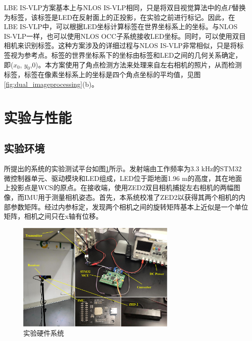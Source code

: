 LBE IS-VLP方案基本上与NLOS IS-VLP相同，只是将双目视觉算法中的点$P$替换为标签，该标签是LED在反射面上的正投影，在实验之前进行标记。因此，在LBE IS-VLP中，可以根据LED坐标计算标签在世界坐标系上的坐标。与NLOS IS-VLP一样，也可以使用NLOS OCC子系统接收LED坐标。同时，可以使用双目相机来识别标签。这种方案涉及的详细过程与NLOS IS-VLP非常相似，只是将标签视为参考点。标签的世界坐标系下的坐标由标签和LED之间的几何关系确定，即(${x_{0}}$, ${y_{0}}$,${0}$)。本方案使用了角点检测方法来处理来自左右相机的照片，从而检测标签，标签在像素坐标系上的坐标是四个角点坐标的平均值，见图\ref{fig:dual_imageprocessing}(b)。
 
\section{实验与性能}
\subsection{实验环境}
所提出的系统的实验测试平台如图\ref{fig:dual_environment-setup}所示。发射端由工作频率为3.3 kHz的STM32微控制器单元、驱动模块和LED组成，LED位于距地面1.96 m的高度，其在地面上投影点是WCS的原点。在接收端，使用ZED2双目相机捕捉左右相机的两幅图像，而IMU用于测量相机姿态。首先，本系统校准了ZED2以获得其两个相机的内部参数矩阵。经过内参标定，发现两个相机之间的旋转矩阵基本上近似是一个单位矩阵，相机之间只在x轴有位移。
\begin{figure}[!htbp]
\centering\includegraphics[width=0.7\textwidth]{FIG/experimentsetup.pdf}
\caption{实验硬件系统}
\label{fig:dual_environment-setup}
\end{figure}


